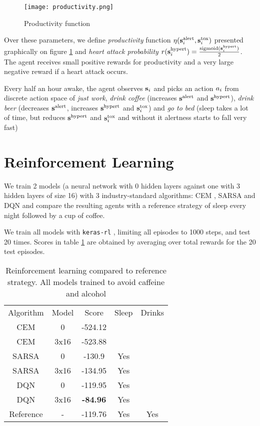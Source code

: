 \begin{figure}
    \centering
    \texttt{[image: productivity.png]}
    \caption{Productivity function}
    \label{fig:productivity}
\end{figure}

Over these parameters, we define \emph{productivity} function $\eta(\textbf{s}^\text{alert}_i, \textbf{s}^\text{tox}_i)$ presented graphically on figure \ref{fig:productivity} and \emph{heart attack probability} $r(\textbf{s}^\text{hypert}_i)=\frac{\text{sigmoid}(\textbf{s}^\text{hypert}_i)}{2}$.
The agent receives small positive rewards for productivity and a very large negative reward if a heart attack occurs.

Every half an hour awake, the agent observes $\textbf{s}_i$ and picks an action $a_i$ from discrete action space of \emph{just work}, \emph{drink coffee} (increases $\textbf{s}^\text{alert}$ and $\textbf{s}^\text{hypert}$), \emph{drink beer} (decreases $\textbf{s}^\text{alert}$, increases $\textbf{s}^\text{hypert}$ and $\textbf{s}^\text{tox}_i$) and \emph{go to bed} (sleep takes a lot of time, but reduces $\textbf{s}^\text{hypert}$ and $\textbf{s}^\text{tox}_i$ and without it alertness starts to fall very fast)

\section{Reinforcement Learning}
\label{sec:heartpole-experiments}


We train 2 models (a neural network with 0 hidden layers against one with 3 hidden layers of size 16) with 3 industry-standard algorithms: CEM \cite{cem}, SARSA \cite[Chapter 6]{thebook} and DQN \cite{dqn1,dqn2} and compare the resulting agents with a reference strategy of sleep every night followed by a cup of coffee.

We train all models with \texttt{keras-rl} \cite{kerasrl}, limiting all episodes to 1000 steps, and test 20 times.
Scores in table \ref{tab:heartpole-results} are obtained by averaging over total rewards for the 20 test episodes.

\begin{table}[]
    \centering
    \begin{tabular}{c|c|c|c|c}
         Algorithm & Model & Score & Sleep & Drinks \\
         CEM & 0 & -524.12 &  &   \\
         CEM & 3x16 & -523.88 & & \\
         SARSA & 0 & -130.9 & Yes & \\
         SARSA & 3x16 & -134.95 & Yes & \\
         DQN & 0 & -119.95 & Yes &  \\
         DQN & 3x16 & \textbf{-84.96} & Yes &  \\
         Reference & - & -119.76 & Yes & Yes 
    \end{tabular}
    \caption{Reinforcement learning compared to reference strategy. All models trained to avoid caffeine and alcohol}
    \label{tab:heartpole-results}
\end{table}

